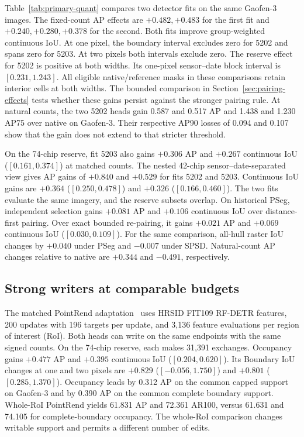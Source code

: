 Table~\ref{tab:primary-quant} compares two detector fits on the same Gaofen-3 images. The fixed-count AP effects are \(+0.482,+0.483\) for the first fit and \(+0.240,+0.280,+0.378\) for the second. Both fits improve group-weighted continuous IoU. At one pixel, the boundary interval excludes zero for 5202 and spans zero for 5203. At two pixels both intervals exclude zero. The reserve effect for 5202 is positive at both widths. Its one-pixel sensor--date block interval is \([0.231,1.243]\). All eligible native/reference masks in these comparisons retain interior cells at both widths. The bounded comparison in Section~\ref{sec:pairing-effects} tests whether these gains persist against the stronger pairing rule. At natural counts, the two 5202 heads gain 0.587 and 0.517 AP and 1.438 and 1.230 AP75 over native on Gaofen-3. Their respective AP90 losses of 0.094 and 0.107 show that the gain does not extend to that stricter threshold.

On the 74-chip reserve, fit 5203 also gains \(+0.306\) AP and \(+0.267\) continuous IoU (\([0.161,0.374]\)) at matched counts. The nested 42-chip sensor--date-separated view gives AP gains of \(+0.840\) and \(+0.529\) for fits 5202 and 5203. Continuous IoU gains are \(+0.364\) (\([0.250,0.478]\)) and \(+0.326\) (\([0.166,0.460]\)). The two fits evaluate the same imagery, and the reserve subsets overlap. On historical PSeg, independent selection gains \(+0.081\) AP and \(+0.106\) continuous IoU over distance-first pairing. Over exact bounded re-pairing, it gains \(+0.021\) AP and \(+0.069\) continuous IoU (\([0.030,0.109]\)). For the same comparison, all-hull raster IoU changes by \(+0.040\) under PSeg and \(-0.007\) under SPSD. Natural-count AP changes relative to native are \(+0.344\) and \(-0.491\), respectively.

\subsection{Strong writers at comparable budgets}
The matched PointRend adaptation~\cite{pointrend} uses HRSID FIT109 RF-DETR features, 200 updates with 196 targets per update, and 3,136 feature evaluations per region of interest (RoI). Both heads can write on the same endpoints with the same signed counts. On the 74-chip reserve, each makes 31,391 exchanges. Occupancy gains \(+0.477\) AP and \(+0.395\) continuous IoU (\([0.204,0.620]\)). Its Boundary IoU changes at one and two pixels are \(+0.829\) (\([-0.056,1.750]\)) and \(+0.801\) (\([0.285,1.370]\)). Occupancy leads by 0.312 AP on the common capped support on Gaofen-3 and by 0.390 AP on the common complete boundary support. Whole-RoI PointRend yields 61.831 AP and 72.361 AR100, versus 61.631 and 74.105 for complete-boundary occupancy. The whole-RoI comparison changes writable support and permits a different number of edits.

